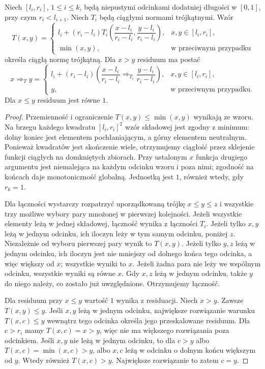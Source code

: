 \begin{lemat}
\label{lem:lst-fuzzy-finite-ordinal-tnorm}
Niech $[l_i,r_i]$, $1\leq i\leq k$, będą niepustymi
odcinkami dodatniej długości w $[0,1]$, przy czym
$r_i<l_{i+1}$. Niech $T_i$ będą ciągłymi normami
trójkątnymi. Wzór
\[
 T(x,y)=
 \begin{cases}
 l_i+(r_i-l_i)T_i\left(
 \dfrac{x-l_i}{r_i-l_i},\dfrac{y-l_i}{r_i-l_i}\right),
 &x,y\in[l_i,r_i],\\
 \min(x,y),&\text{w przeciwnym przypadku}
 \end{cases}
\]
określa ciągłą normę trójkątną.
Dla $x>y$ residuum ma postać
\[
 x\Rightarrow_T y=
 \begin{cases}
 l_i+(r_i-l_i)
 \left(\dfrac{x-l_i}{r_i-l_i}
 \Rightarrow_{T_i}\dfrac{y-l_i}{r_i-l_i}\right),
 &x,y\in[l_i,r_i],\\
 y,&\text{w przeciwnym przypadku}.
 \end{cases}
\]
Dla $x\leq y$ residuum jest równe $1$.
\end{lemat}
\begin{proof}
Przemienność i ograniczenie $T(x,y)\leq\min(x,y)$
wynikają ze wzoru. Na brzegu każdego kwadratu
$[l_i,r_i]^2$ wzór składowej jest zgodny z minimum:
dolny koniec jest elementem pochłaniającym,
a górny elementem neutralnym. Ponieważ kwadratów
jest skończenie wiele, otrzymujemy ciągłość przez
sklejenie funkcji ciągłych na domkniętych zbiorach.
Przy ustalonym $x$ funkcja drugiego argumentu jest
niemalejąca na każdym odcinku wzoru i poza nimi;
zgodność na końcach daje monotoniczność globalną.
Jednostką jest $1$, również wtedy, gdy $r_k=1$.

Dla łączności wystarczy rozpatrzyć uporządkowaną
trójkę $x\leq y\leq z$ i wszystkie trzy możliwe
wybory pary mnożonej w pierwszej kolejności.
Jeżeli wszystkie elementy leżą w jednej składowej,
łączność wynika z łączności $T_i$.
Jeżeli tylko $x,y$ leżą w jednym odcinku, ich
iloczyn leży w tym samym odcinku, poniżej $z$.
Niezależnie od wyboru pierwszej pary wynik to $T(x,y)$.
Jeżeli tylko $y,z$ leżą w jednym odcinku, ich iloczyn
jest nie mniejszy od dolnego końca tego odcinka,
a więc większy od $x$; wszystkie wyniki to $x$.
Jeżeli żadna para nie leży we wspólnym odcinku,
wszystkie wyniki są równe $x$. Gdy $x,z$ leżą
w jednym odcinku, także $y$ do niego należy, co
zostało już uwzględnione. Otrzymujemy łączność.

Dla residuum przy $x\leq y$ wartość $1$ wynika
z residuacji. Niech $x>y$. Zawsze $T(x,y)\leq y$.
Jeśli $x,y$ leżą w jednym odcinku, największe
rozwiązanie warunku $T(x,c)\leq y$ wewnątrz tego
odcinka określa jego przeskalowane residuum.
Dla $c>r_i$ mamy $T(x,c)=x>y$, więc nie ma
większego rozwiązania poza odcinkiem.
Jeśli $x,y$ nie leżą w jednym odcinku, to dla
$c>y$ albo $T(x,c)=\min(x,c)>y$, albo $x,c$ leżą
w odcinku o dolnym końcu większym od $y$.
Wtedy również $T(x,c)>y$. Największe rozwiązanie
to zatem $c=y$.
\end{proof}

